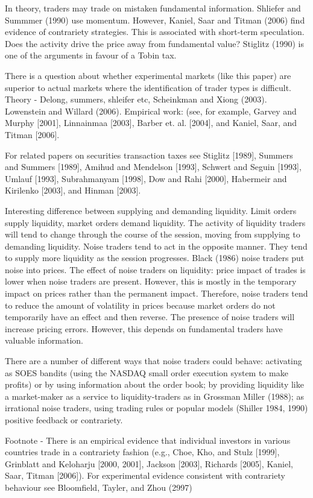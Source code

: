 \documentclass[12pt, a4paper, oneside]{article} %
\begin{document}
In theory, traders may trade on mistaken fundamental information.  Shliefer and Summmer (1990) use momentum.  However, Kaniel, Saar and Titman (2006) find evidence of contrariety strategies. This is associated with short-term speculation. Does the activity drive the price away from fundamental value? Stiglitz (1990) is one of the arguments in favour of a Tobin tax. 

There is a question about whether experimental markets (like this paper) are superior to actual markets where the identification of trader types is difficult.  Theory - Delong, summers, shleifer etc,  Scheinkman and Xiong (2003).  Lowenstein and Willard (2006).  Empirical work:  (see, for example, Garvey and Murphy [2001], Linnainmaa [2003], Barber et. al. [2004], and Kaniel, Saar, and Titman [2006].  

For related papers on securities transaction taxes see Stiglitz [1989], Summers and Summers [1989], 
Amihud and Mendelson [1993], Schwert and Seguin [1993], Umlauf [1993], Subrahmanyam [1998], Dow 
and Rahi [2000], Habermeir and Kirilenko [2003], and Hinman [2003]. 

Interesting difference between supplying and demanding liquidity.  Limit orders supply liquidity, market orders demand liquidity.  The activity of liquidity traders will tend to change through the course of the session, moving from supplying to demanding liquidity. Noise traders tend to act in the opposite manner.  They tend to supply more liquidity as the session progresses. Black (1986) noise traders put noise into prices.  The effect of noise traders on liquidity: price impact of trades is lower when noise traders are present.  However, this is mostly in the temporary impact on prices rather than the permanent impact. Therefore, noise traders tend to reduce the amount of volatility in prices because market orders do not temporarily have an effect and then reverse.  The presence of noise traders will increase pricing errors. However, this depends on fundamental traders have valuable information. 

There are a number of different ways that noise traders could behave:  activating as SOES bandits (using the NASDAQ small order execution system to make profits) or by using information about the order book; by providing liquidity like a market-maker as a service to liquidity-traders as in Grossman Miller (1988);  as irrational noise traders, using trading rules or popular models (Shiller 1984, 1990) positive feedback or contrariety.  

Footnote -  There is an empirical evidence that individual investors in various countries trade in a contrariety fashion (e.g., Choe, Kho, and Stulz [1999], Grinblatt and Keloharju [2000, 2001], Jackson [2003], Richards [2005], Kaniel, Saar, Titman [2006]). For experimental evidence consistent with contrariety behaviour see 
Bloomfield, Tayler, and Zhou (2997)
\end{document}
